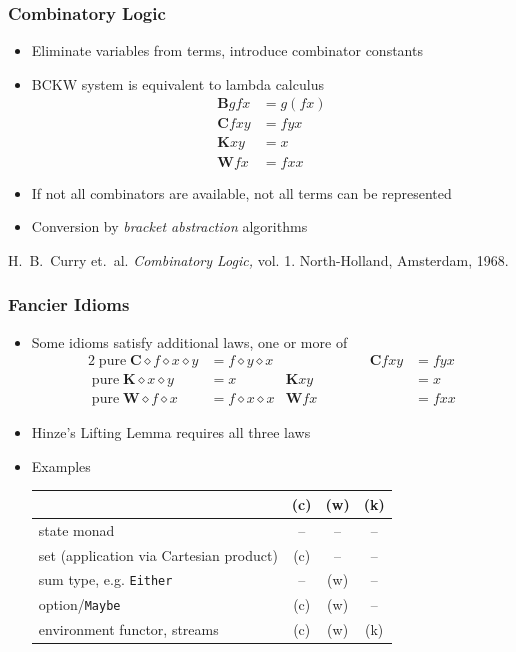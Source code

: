 \documentclass[smaller,leqno]{beamer}
\newenvironment{reference}{\begingroup\scriptsize\singlespacing\color{gray}}{\par\endgroup}
\DeclareMathOperator{\pure}{pure}
\newcommand{\ap}{\diamond}
\begin{document}
\begin{frame}
\frametitle{Combinatory Logic}

\begin{itemize}
\item Eliminate variables from terms, introduce combinator constants
\item BCKW system is equivalent to lambda calculus
\begin{align*}
\mathbf{B} g f x &= g (f x) \\
\mathbf{C} f x y &= f y x \\
\mathbf{K} x y &= x \\
\mathbf{W} f x &= f x x
\end{align*}
\pause
\item If not all combinators are available, not all terms can be represented
\item Conversion by \emph{bracket abstraction} algorithms
\end{itemize}

\vspace{\fill}
\begin{reference}
H.\ B.\ Curry et.\ al. \emph{Combinatory Logic,} vol. 1.
North-Holland, Amsterdam, 1968.
\end{reference}
\end{frame}

\begin{frame}
\frametitle{Fancier Idioms}

\begin{itemize}
\item Some idioms satisfy additional laws, one or more of
\begin{alignat*}{2}
\pure \mathbf{C} \ap f \ap x \ap y &= f \ap y \ap x \tag{c} &\hspace{6em} \mathbf{C} f x y &= f y x \\
\pure \mathbf{K} \ap x \ap y &= x \tag{k} & \mathbf{K} x y &= x \\
\pure \mathbf{W} \ap f \ap x &= f \ap x \ap x \tag{w} & \mathbf{W} f x &= f x x
\end{alignat*}
\item Hinze's Lifting Lemma requires all three laws
\item Examples

\vspace{1mm}
\begin{tabular}{lccc}
 & (c) & (w) & (k) \\\hline
state monad & -- & -- & -- \\
set (application via Cartesian product) & (c) & -- & -- \\
sum type, e.g. \lstinline|Either| & -- & (w) & -- \\
option/\lstinline|Maybe| & (c) & (w) & -- \\
environment functor, streams & (c) & (w) & (k)
\end{tabular}
\end{itemize}
\end{frame}
\end{document}
